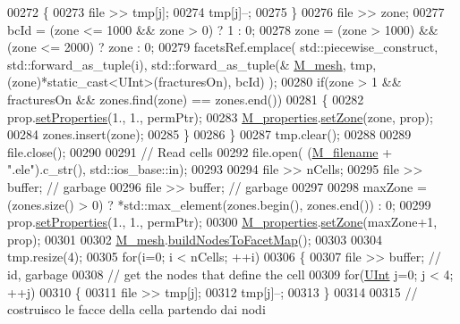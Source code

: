 \begin{DoxyCode}
00272         \{
00273             file >> tmp[j];
00274             tmp[j]--;
00275         \}
00276         file >> zone;
00277         bcId = (zone <= 1000 && zone > 0) ? 1 : 0;
00278         zone = (zone > 1000) && (zone <= 2000) ? zone : 0;
00279         facetsRef.emplace( std::piecewise\_construct, std::forward\_as\_tuple(i), std::forward\_as\_tuple(&
      \hyperlink{classFVCode3D_1_1Importer_a6f1542d6c6ac192e36c8eec7dc366653}{M\_mesh}, tmp, (zone)*static\_cast<UInt>(fracturesOn), bcId) );
00280         \textcolor{keywordflow}{if}(zone > 1 && fracturesOn && zones.find(zone) == zones.end())
00281         \{
00282             prop.\hyperlink{classFVCode3D_1_1Properties_a0ddb477254cfacdb96a440ddedc2548c}{setProperties}(1., 1., permPtr);
00283             \hyperlink{classFVCode3D_1_1Importer_af678e18e971d5a132f5ba494981f6dae}{M\_properties}.\hyperlink{classFVCode3D_1_1PropertiesMap_ac303adadd1101e7bee62ecad0e8ea6ac}{setZone}(zone, prop);
00284             zones.insert(zone);
00285         \}
00286     \}
00287     tmp.clear();
00288 
00289     file.close();
00290 
00291     \textcolor{comment}{// Read cells}
00292     file.open( (\hyperlink{classFVCode3D_1_1Importer_a318e689fb93c5c906f85aa13685724d7}{M\_filename} + \textcolor{stringliteral}{".ele"}).c\_str(), std::ios\_base::in);
00293 
00294     file >> nCells;
00295     file >> buffer; \textcolor{comment}{// garbage}
00296     file >> buffer; \textcolor{comment}{// garbage}
00297 
00298     maxZone = (zones.size() > 0) ? *std::max\_element(zones.begin(), zones.end()) : 0;
00299     prop.\hyperlink{classFVCode3D_1_1Properties_a0ddb477254cfacdb96a440ddedc2548c}{setProperties}(1., 1., permPtr);
00300     \hyperlink{classFVCode3D_1_1Importer_af678e18e971d5a132f5ba494981f6dae}{M\_properties}.\hyperlink{classFVCode3D_1_1PropertiesMap_ac303adadd1101e7bee62ecad0e8ea6ac}{setZone}(maxZone+1, prop);
00301 
00302     \hyperlink{classFVCode3D_1_1Importer_a6f1542d6c6ac192e36c8eec7dc366653}{M\_mesh}.\hyperlink{classFVCode3D_1_1Mesh3D_a609f980329f5a98e9fad724049e509d2}{buildNodesToFacetMap}();
00303 
00304     tmp.resize(4);
00305     \textcolor{keywordflow}{for}(i=0; i < nCells; ++i)
00306     \{
00307         file >> buffer; \textcolor{comment}{// id, garbage}
00308         \textcolor{comment}{// get the nodes that define the cell}
00309         \textcolor{keywordflow}{for}(\hyperlink{namespaceFVCode3D_a4bf7e328c75d0fd504050d040ebe9eda}{UInt} j=0; j < 4; ++j)
00310         \{
00311             file >> tmp[j];
00312             tmp[j]--;
00313         \}
00314 
00315         \textcolor{comment}{// costruisco le facce della cella partendo dai nodi}

\end{DoxyCode}
